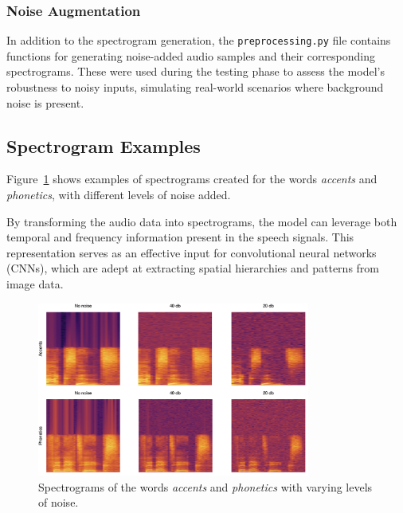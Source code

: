 \documentclass[12pt]{article}
\begin{document}
\subsubsection{Noise Augmentation}

In addition to the spectrogram generation, the \texttt{preprocessing.py} file contains functions for generating noise-added audio samples and their corresponding spectrograms. These were used during the testing phase to assess the model’s robustness to noisy inputs, simulating real-world scenarios where background noise is present.

\subsection{Spectrogram Examples}

Figure~\ref{fig:spectrograms} shows examples of spectrograms created for the words \textit{accents} and \textit{phonetics}, with different levels of noise added.

By transforming the audio data into spectrograms, the model can leverage both temporal and frequency information present in the speech signals. This representation serves as an effective input for convolutional neural networks (CNNs), which are adept at extracting spatial hierarchies and patterns from image data.

\begin{figure}[h]
\centering
\includegraphics[width=0.8\textwidth]{spectrograms.png}
\caption{Spectrograms of the words \textit{accents} and \textit{phonetics} with varying levels of noise.}
\label{fig:spectrograms}
\end{figure}

\clearpage


\end{document}
